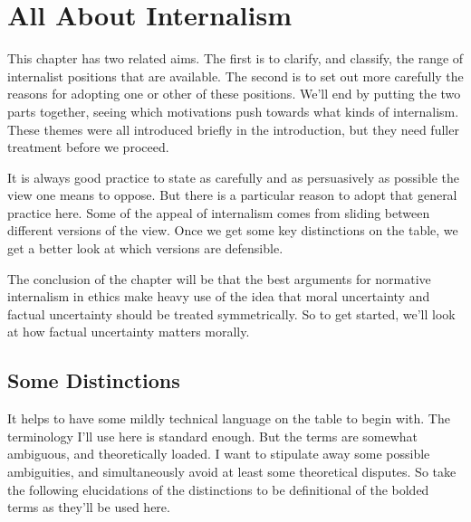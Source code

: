 \chapter{All About Internalism}
\label{allaboutinternalism}

This chapter has two related aims. The first is to clarify, and classify, the range of internalist positions that are available. The second is to set out more carefully the reasons for adopting one or other of these positions. We'll end by putting the two parts together, seeing which motivations push towards what kinds of internalism. These themes were all introduced briefly in the introduction, but they need fuller treatment before we proceed.

It is always good practice to state as carefully and as persuasively as possible the view one means to oppose. But there is a particular reason to adopt that general practice here. Some of the appeal of internalism comes from sliding between different versions of the view. Once we get some key distinctions on the table, we get a better look at which versions are defensible.

The conclusion of the chapter will be that the best arguments for normative internalism in ethics make heavy use of the idea that moral uncertainty and factual uncertainty should be treated symmetrically. So to get started, we'll look at how factual uncertainty matters morally.

\section{Some Distinctions}
\label{somedistinctions}

It helps to have some mildly technical language on the table to begin with. The terminology I'll use here is standard enough. But the terms are somewhat ambiguous, and theoretically loaded. I want to stipulate away some possible ambiguities, and simultaneously avoid at least some theoretical disputes. So take the following elucidations of the distinctions to be definitional of the bolded terms as they'll be used here.

